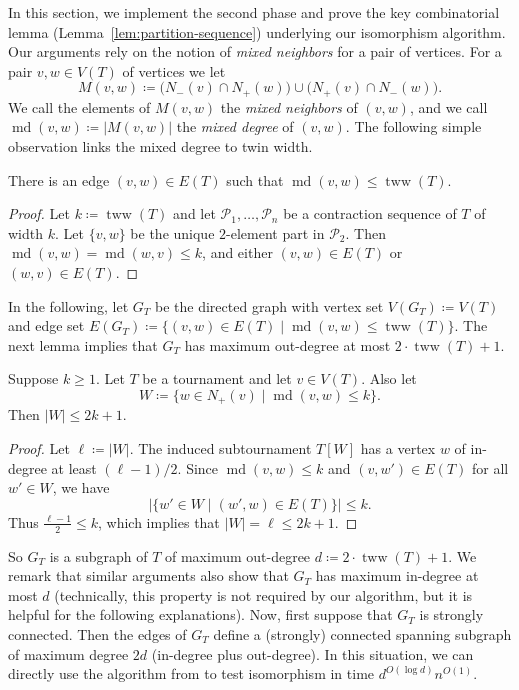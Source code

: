 \documentclass{theoretics}
\newcommand{\CP}{{\mathcal P}}
\DeclareMathOperator{\md}{md}
\DeclareMathOperator{\tww}{tww}
\begin{document}
In this section, we implement the second phase and prove the key combinatorial lemma (Lemma~\ref{lem:partition-sequence}) underlying our isomorphism algorithm.
Our arguments rely on the notion of \emph{mixed neighbors} for a pair of vertices.
For a pair $v,w\in V(T)$ of vertices we let
\begin{equation}
 M(v,w) \coloneqq \Big(N_-(v)\cap N_+(w)\Big)\cup \Big(N_+(v)\cap N_-(w)\Big).
\end{equation}
We call the elements of $M(v,w)$ the \emph{mixed neighbors} of $(v,w)$,
and we call $\md(v,w) \coloneqq |M(v,w)|$ the \emph{mixed degree} of $(v,w)$.
The following simple observation links the mixed degree to twin width.

\begin{observation}
 \label{obs:edge-small-mixed-degree}
 There is an edge $(v,w) \in E(T)$ such that $\md(v,w) \leq \tww(T)$.
\end{observation}

\begin{proof}
 Let $k \coloneqq \tww(T)$ and let $\CP_1,\dots,\CP_n$ be a contraction sequence of $T$ of width $k$.
 Let $\{v,w\}$ be the unique $2$-element part in $\CP_2$.
 Then $\md(v,w)=\md(w,v) \leq k$, and either $(v,w)\in E(T)$ or $(w,v)\in E(T)$.
\end{proof}

In the following, let $G_T$ be the directed graph with vertex set $V(G_T) \coloneqq V(T)$ and edge set $E(G_T) \coloneqq \{(v,w) \in E(T) \mid \md(v,w) \leq \tww(T)\}$.
The next lemma implies that $G_T$ has maximum out-degree at most $2\cdot\tww(T) + 1$.

\begin{lemma}
 \label{lem:mixed-degree-few-neighbors}
 Suppose $k \geq 1$.
 Let $T$ be a tournament and let $v \in V(T)$.
 Also let
 \[W \coloneqq \{w \in N_+(v) \mid \md(v,w) \leq k\}.\]
 Then $|W| \leq 2k + 1$.
\end{lemma}

\begin{proof}
 Let $\ell \coloneqq |W|$. The induced subtournament $T[W]$ has
 a vertex $w$ of in-degree at least $(\ell-1)/2$.
 Since $\md(v,w) \leq k$ and $(v,w') \in E(T)$ for all $w' \in W$, we have
 \[|\{w' \in W \mid (w',w) \in E(T)\}| \leq k.\]
 Thus $\frac{\ell - 1}{2} \leq k$, which implies that $|W| = \ell \leq 2k + 1$.
\end{proof}

So $G_T$ is a subgraph of $T$ of maximum out-degree $d \coloneqq 2\cdot\tww(T) + 1$.
We remark that similar arguments also show that $G_T$ has maximum in-degree at most $d$ (technically, this property is not required by our algorithm, but it is helpful for the following explanations).
Now, first suppose that $G_T$ is strongly connected.
Then the edges of $G_T$ define a (strongly) connected spanning subgraph of maximum degree $2d$ (in-degree plus out-degree).
In this situation, we can directly use the algorithm from \cite{ArvindPR25} to test isomorphism in time $d^{O(\log d)}n^{O(1)}$.
\end{document}
